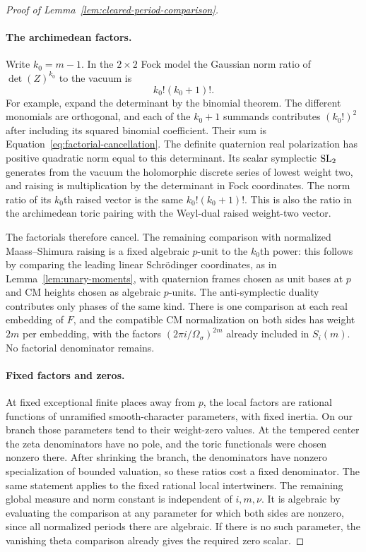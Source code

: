 \begin{proof}[Proof of Lemma~\ref{lem:cleared-period-comparison}]
\paragraph{The archimedean factors.}
Write $k_0=m-1$.  In the $2\times2$ Fock model the Gaussian norm ratio
of $\det(Z)^{k_0}$ to the vacuum is
\begin{equation}\label{eq:factorial-cancellation}
 k_0!(k_0+1)!.
\end{equation}
For example, expand the determinant by the binomial theorem.  The
different monomials are orthogonal, and each of the $k_0+1$ summands
contributes $(k_0!)^2$ after including its squared binomial coefficient.
Their sum is Equation~\ref{eq:factorial-cancellation}.  The definite
quaternion real polarization has positive quadratic norm equal to this
determinant.  Its scalar symplectic $\operatorname{SL}_2$ generates from the vacuum
the holomorphic discrete series of lowest weight two, and raising is
multiplication by the determinant in Fock coordinates.  The norm ratio
of its $k_0$th raised vector is the same $k_0!(k_0+1)!$.  This is also
the ratio in the archimedean toric pairing with the Weyl-dual raised
weight-two vector.

The factorials therefore cancel.  The remaining comparison with
normalized Maass--Shimura raising is a fixed algebraic $p$-unit to the
$k_0$th power: this follows by comparing the leading linear
Schr\"odinger coordinates, as in Lemma~\ref{lem:unary-moments}, with
quaternion frames chosen as unit bases at $p$ and CM heights chosen as
algebraic $p$-units.
The anti-symplectic duality contributes only phases of the same kind.
There is one comparison at each real embedding of $F$, and the
compatible CM normalization on both sides has weight $2m$ per
embedding, with the factors $(2\pi i/\Omega_\sigma)^{2m}$ already
included in $S_i(m)$.  No factorial denominator remains.

\paragraph{Fixed factors and zeros.}
At fixed exceptional finite places away from $p$, the local factors
are rational functions of unramified smooth-character parameters,
with fixed inertia.  On our branch those parameters tend to their
weight-zero values.  At the tempered center the zeta denominators have
no pole, and the toric functionals were chosen nonzero there.  After
shrinking the branch, the denominators have nonzero specialization of
bounded valuation, so these ratios cost a fixed denominator.
The same statement applies to the fixed rational local intertwiners.
The remaining global measure and norm constant is independent of
$i,m,\nu$.  It is algebraic by evaluating the comparison at any
parameter for which both sides are nonzero, since all normalized
periods there are algebraic.  If there is no such parameter, the
vanishing theta comparison already gives the required zero scalar.


\end{proof}
